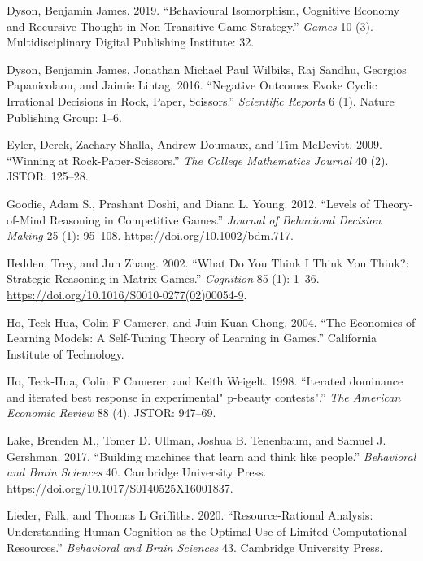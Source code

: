 \documentclass[smallextended]{svjour3}       %
\begin{document}
\leavevmode\hypertarget{ref-dyson2019behavioural}{}%
Dyson, Benjamin James. 2019. ``Behavioural Isomorphism, Cognitive
Economy and Recursive Thought in Non-Transitive Game Strategy.''
\emph{Games} 10 (3). Multidisciplinary Digital Publishing Institute: 32.

\leavevmode\hypertarget{ref-dyson2016negative}{}%
Dyson, Benjamin James, Jonathan Michael Paul Wilbiks, Raj Sandhu,
Georgios Papanicolaou, and Jaimie Lintag. 2016. ``Negative Outcomes
Evoke Cyclic Irrational Decisions in Rock, Paper, Scissors.''
\emph{Scientific Reports} 6 (1). Nature Publishing Group: 1--6.

\leavevmode\hypertarget{ref-eyler2009winning}{}%
Eyler, Derek, Zachary Shalla, Andrew Doumaux, and Tim McDevitt. 2009.
``Winning at Rock-Paper-Scissors.'' \emph{The College Mathematics
Journal} 40 (2). JSTOR: 125--28.

\leavevmode\hypertarget{ref-goodie_levels_2012}{}%
Goodie, Adam S., Prashant Doshi, and Diana L. Young. 2012. ``Levels of
Theory-of-Mind Reasoning in Competitive Games.'' \emph{Journal of
Behavioral Decision Making} 25 (1): 95--108.
\url{https://doi.org/10.1002/bdm.717}.

\leavevmode\hypertarget{ref-hedden_what_2002}{}%
Hedden, Trey, and Jun Zhang. 2002. ``What Do You Think I Think You
Think?: Strategic Reasoning in Matrix Games.'' \emph{Cognition} 85 (1):
1--36. \url{https://doi.org/10.1016/S0010-0277(02)00054-9}.

\leavevmode\hypertarget{ref-ho2004economics}{}%
Ho, Teck-Hua, Colin F Camerer, and Juin-Kuan Chong. 2004. ``The
Economics of Learning Models: A Self-Tuning Theory of Learning in
Games.'' California Institute of Technology.

\leavevmode\hypertarget{ref-ho1998iterated}{}%
Ho, Teck-Hua, Colin F Camerer, and Keith Weigelt. 1998. ``Iterated
dominance and iterated best response in experimental" p-beauty
contests".'' \emph{The American Economic Review} 88 (4). JSTOR: 947--69.

\leavevmode\hypertarget{ref-Lake2017}{}%
Lake, Brenden M., Tomer D. Ullman, Joshua B. Tenenbaum, and Samuel J.
Gershman. 2017. ``Building machines that learn and think like people.''
\emph{Behavioral and Brain Sciences} 40. Cambridge University Press.
\url{https://doi.org/10.1017/S0140525X16001837}.

\leavevmode\hypertarget{ref-lieder2020resource}{}%
Lieder, Falk, and Thomas L Griffiths. 2020. ``Resource-Rational
Analysis: Understanding Human Cognition as the Optimal Use of Limited
Computational Resources.'' \emph{Behavioral and Brain Sciences} 43.
Cambridge University Press.
\end{document}

